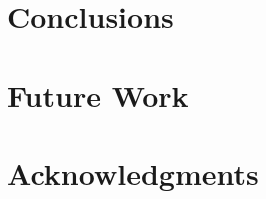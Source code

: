 \documentclass{csri08}
\begin{document}
\section{Conclusions} \label{IK:sec:conclu}


\section{Future Work} \label{IK:sec:future}


\section{Acknowledgments} \label{IK:sec:acknowledgments}





%
\end{document}
